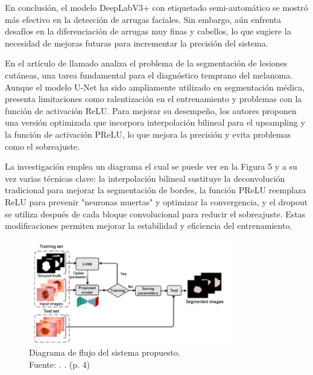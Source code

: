 En conclusión, el modelo DeepLabV3+ con etiquetado semi-automático se mostró más efectivo en la detección de arrugas faciales. Sin embargo, aún enfrenta desafíos en la diferenciación de arrugas muy finas y cabellos, lo que sugiere la necesidad de mejoras futuras para incrementar la precisión del sistema.



En el artículo de \cite{karshiev2020improved} llamado  analiza el problema de la segmentación de lesiones cutáneas, una tarea fundamental para el diagnóstico temprano del melanoma. Aunque el modelo U-Net ha sido ampliamente utilizado en segmentación médica, presenta limitaciones como ralentización en el entrenamiento y problemas con la función de activación ReLU. Para mejorar su desempeño, los autores proponen una versión optimizada que incorpora interpolación bilineal para el upsampling y la función de activación PReLU, lo que mejora la precisión y evita problemas como el sobreajuste.

La investigación emplea un diagrama el cual se puede ver en la Figura 5 y a su vez varias técnicas clave: la interpolación bilineal sustituye la deconvolución tradicional para mejorar la segmentación de bordes, la función PReLU reemplaza ReLU para prevenir "neuronas muertas" y optimizar la convergencia, y el dropout se utiliza después de cada bloque convolucional para reducir el sobreajuste. Estas modificaciones permiten mejorar la estabilidad y eficiencia del entrenamiento.

\begin{figure}[!ht]
	\begin{center}
		\includegraphics[width=0.80\textwidth]{2/figures/flowchart.png}
		\caption[Diagrama de flujo del sistema propuesto]{Diagrama de flujo del sistema propuesto.\\
			Fuente: \cite{karshiev2020improved}. . (p. 4)}
		\label{2:fig5}
	\end{center}
\end{figure}

